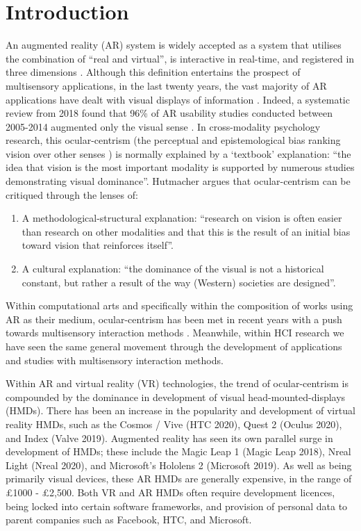 \section{Introduction}                          \label{sec: area-intro}
An augmented reality (AR) system is widely accepted as a system that utilises the combination of “real and virtual”, is interactive in real-time, and registered in three dimensions \citep{azuma1997}. Although this definition entertains the prospect of multisensory applications, in the last twenty years, the vast majority of AR applications have dealt with visual displays of information \citep{billinghurst2015, schraffenberger2016}. Indeed, a systematic review from 2018 found that 96\% of AR usability studies conducted between 2005-2014 augmented only the visual sense \citep{dey2018}. In cross-modality psychology research, this ocular-centrism (the perceptual and epistemological bias ranking vision over other senses \citep{oxfordreference2020}) is normally explained by a ‘textbook’ explanation: “the idea that vision is the most important modality is supported by numerous studies demonstrating visual dominance”. Hutmacher \citeyearpar{hutmacher2019} argues that ocular-centrism can be critiqued through the lenses of:
\begin{enumerate}
    \item A methodological-structural explanation: “research on vision is often easier than research on other modalities and that this is the result of an initial bias toward vision that reinforces itself”.
    \item A cultural explanation: “the dominance of the visual is not a historical constant, but rather a result of the way (Western) societies are designed”.
\end{enumerate}
Within computational arts and specifically within the composition of works using AR as their medium, ocular-centrism has been met in recent years with a push towards multisensory interaction methods \citep{billinghurst2015, schraffenberger2016,papagiannis2014,kiefer2018}. Meanwhile, within HCI research we have seen the same general movement through the development of applications and studies with multisensory interaction methods.

Within AR and virtual reality (VR) technologies, the trend of ocular-centrism is compounded by the dominance in development of visual head-mounted-displays (HMDs). There has been an increase in the popularity and development of virtual reality HMDs, such as the Cosmos / Vive (HTC 2020), Quest 2 (Oculus 2020), and Index (Valve 2019). Augmented reality has seen its own parallel surge in development of HMDs; these include the Magic Leap 1 (Magic Leap 2018), Nreal Light (Nreal 2020), and Microsoft’s Hololens 2 (Microsoft 2019). As well as being primarily visual devices, these AR HMDs are generally expensive, in the range of £1000 - £2,500. Both VR and AR HMDs often require development licences, being locked into certain software frameworks, and provision of personal data to parent companies such as Facebook, HTC, and Microsoft.

